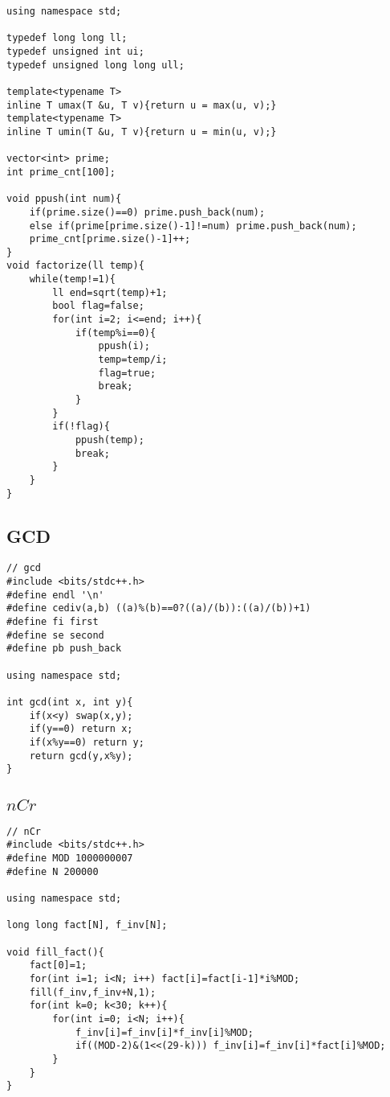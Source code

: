 \documentclass[10pt, landscape]{article}
\begin{document}
\begin{multicols}{2}
\begin{verbatim}
using namespace std;

typedef long long ll;
typedef unsigned int ui;
typedef unsigned long long ull;

template<typename T>
inline T umax(T &u, T v){return u = max(u, v);}
template<typename T>
inline T umin(T &u, T v){return u = min(u, v);}

vector<int> prime;
int prime_cnt[100];

void ppush(int num){
    if(prime.size()==0) prime.push_back(num);
    else if(prime[prime.size()-1]!=num) prime.push_back(num);
    prime_cnt[prime.size()-1]++;
}
void factorize(ll temp){
    while(temp!=1){
        ll end=sqrt(temp)+1;
        bool flag=false;
        for(int i=2; i<=end; i++){
            if(temp%i==0){
                ppush(i);
                temp=temp/i;
                flag=true;
                break;
            }
        }
        if(!flag){
            ppush(temp);
            break;
        }
    }
}
\end{verbatim}

\subsection{GCD}
\begin{verbatim}
// gcd
#include <bits/stdc++.h>
#define endl '\n'
#define cediv(a,b) ((a)%(b)==0?((a)/(b)):((a)/(b))+1)
#define fi first
#define se second
#define pb push_back

using namespace std;

int gcd(int x, int y){
    if(x<y) swap(x,y);
    if(y==0) return x;
    if(x%y==0) return y;
    return gcd(y,x%y);
}
\end{verbatim}

\subsection{$nCr$}
\begin{verbatim}
// nCr
#include <bits/stdc++.h>
#define MOD 1000000007
#define N 200000

using namespace std;

long long fact[N], f_inv[N];

void fill_fact(){
    fact[0]=1;
    for(int i=1; i<N; i++) fact[i]=fact[i-1]*i%MOD;
    fill(f_inv,f_inv+N,1);
    for(int k=0; k<30; k++){
        for(int i=0; i<N; i++){
            f_inv[i]=f_inv[i]*f_inv[i]%MOD;
            if((MOD-2)&(1<<(29-k))) f_inv[i]=f_inv[i]*fact[i]%MOD;
        }
    }
}


\end{verbatim}
\end{multicols}
\end{document}
